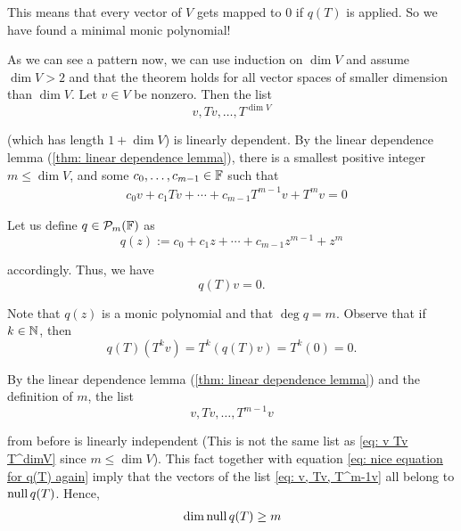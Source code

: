 \begin{prf}
  This means that every vector of $V$ gets mapped to $0$ if $q(T)$ is applied. So we have found a minimal monic polynomial!

   As we can see a pattern now, we can use induction on $\dim V$ and assume $\dim V > 2$ and that the theorem holds for all vector spaces of smaller dimension than $\dim V$.
  Let $v\in V$ be nonzero. Then the list
  \begin{equation}
    \label{eq: v Tv T^dimV}
    v, Tv, \dots, T^{\dim V}
  \end{equation}

  (which has length $1+\dim V$) is linearly dependent.
  By the linear dependence lemma (\ref{thm: linear dependence lemma}), there is a smallest positive integer $m\leq \dim V$,  and some $c_0, \ldots, c_{m-1} \in \mathbb{F}$ such that
  \begin{equation}
    \begin{aligned}
      &c_0 v + c_1 Tv + \cdots + c_{m-1} T^{m-1} v + T^m v = 0
    \end{aligned}
  \end{equation}

  Let us define $q \in \mathcal{P}_m (\mathbb{F})$ as
  \begin{equation}
    q(z) := c_0 + c_1z + \cdots + c_{m-1} z^{m-1} +z^{m}
  \end{equation}

  accordingly. Thus, we have
  \begin{equation}
    q(T) v=0.
  \end{equation}

  Note that $q(z)$ is a monic polynomial and that $\deg q = m$. Observe that if $k \in \mathbb{N}$, then
  \begin{equation}
    \label{eq: nice equation for q(T) again}
    q(T)(T^kv)=T^k(q(T)v) =T^k (0) =0.
  \end{equation}

  By the linear dependence lemma (\ref{thm: linear dependence lemma}) and the definition of $m$, the list
  \begin{equation}
    \label{eq: v, Tv, T^m-1v}
    v, Tv, \dots, T^{m-1}v
  \end{equation}

  from before is linearly independent (This is not the same list as \eqref{eq: v Tv T^dimV}  since $m \leq \dim V$). This fact together with equation \eqref{eq: nice equation for q(T) again} imply that the vectors of the list \eqref{eq: v, Tv, T^m-1v} all belong to $\operatorname{null} q(T)$. Hence,
  \begin{equation}
    \begin{aligned}
      &\dim \operatorname{null} q(T)   \geq m \\
    \end{aligned}
  \end{equation}


\end{prf}
